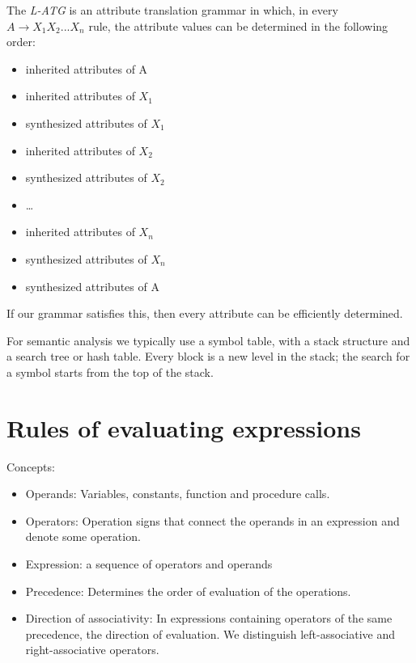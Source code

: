 \documentclass[margin=0px]{article}
\begin{document}
The \textit{L-ATG} is an attribute translation grammar in which, in every
$ A	\rightarrow	X_1X_2 . . .	X_n  $ rule, the attribute values can be determined in the following order:

\begin{itemize}
    \item
          inherited attributes of A
    \item
          inherited attributes of $ X_1 $
    \item
          synthesized attributes of $ X_1 $
    \item
          inherited attributes of $ X_2 $
    \item
          synthesized attributes of $ X_2 $
    \item
          \dots
    \item
          inherited attributes of $ X_n $
    \item
          synthesized attributes of $ X_n $
    \item
          synthesized attributes of A
\end{itemize}

If our grammar satisfies this, then every attribute can be efficiently determined.

For semantic analysis we typically use a symbol table, with a stack structure and a search tree or hash table. Every block is a new level in the stack; the search for a symbol starts from the top of the stack.

\section{Rules of evaluating expressions}

\noindent Concepts:
\begin{itemize}
    \item	Operands: Variables, constants, function and procedure calls.

    \item	Operators: Operation signs that connect the operands in an expression and denote some
          operation.

    \item	Expression: a sequence of operators and operands

    \item	Precedence: Determines the order of evaluation of the operations.

    \item	Direction of associativity: In expressions containing operators of the same precedence, the direction of evaluation.
          We distinguish left-associative and right-associative operators.
\end{itemize}
\end{document}

